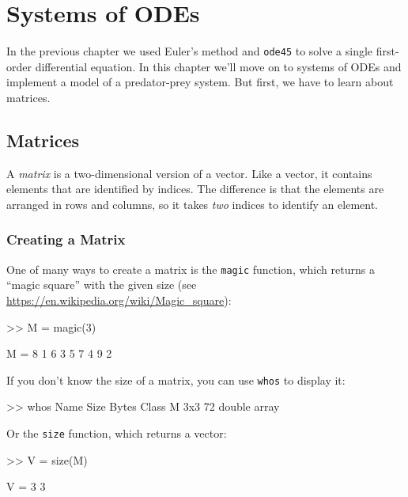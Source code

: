 \chapter{Systems of ODEs}
\label{systems}
\minitoc

In the previous chapter we used Euler's method and {\tt ode45} to solve a single first-order differential equation.  In this chapter we'll move on to systems of ODEs and implement a model of a predator-prey system. But first, we have to learn about matrices.


\section{Matrices}

A \emph{matrix} is a two-dimensional version of a vector.  Like a vector,
it contains elements that are identified by indices.  The difference
is that the elements are arranged in rows and columns, so it takes
{\em two} indices to identify an element.

\subsection{Creating a Matrix}


One of many ways to create a matrix is the {\tt magic} function,
which returns a ``magic square'' with the given size (see \url{https://en.wikipedia.org/wiki/Magic_square}):


\begin{code}
>> M = magic(3)

M =  8     1     6
     3     5     7
     4     9     2
\end{code}

If you don't know the size of a matrix, you can use {\tt whos} to
display it:

\begin{code}
>> whos
  Name        Size                    Bytes  Class
  M           3x3                        72  double array
\end{code}

Or the {\tt size} function, which returns a vector:


\begin{code}
>> V = size(M)

V = 3     3
\end{code}

